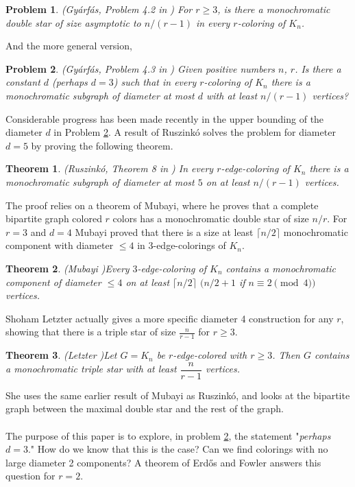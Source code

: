 \documentclass{article}
\newtheorem{theorem}{Theorem}
\newtheorem{problem}{Problem}
\begin{document}
	\begin{problem}\label{P1}(Gy\'arf\'as, Problem 4.2 in \cite{Gy2})
		For $r\ge 3$, is there a
		monochromatic double star of size asymptotic to $n/(r-1)$ in every $r$-coloring of $K_n$.
	\end{problem}
	And the more general version,
	\begin{problem}\label{P2}(Gy\'arf\'as, Problem 4.3 in \cite{Gy2})
		Given positive numbers $n$, $r$.
		Is there a constant $d$ (perhaps $d=3$)
		such that in every $r$-coloring of $K_n$ there is a monochromatic subgraph of diameter at
		most $d$ with at least $n/(r-1)$ vertices?
	\end{problem}
	Considerable progress has been made recently in the upper bounding of the diameter $ d $ in Problem \ref{P2}.
	A result of Ruszink\'{o} solves the problem for diameter $ d=5 $ by proving the following theorem.
	\begin{theorem}\label{fo1}(Ruszink\'{o}, Theorem 8 in \cite{rusz})
		In every $r$-edge-coloring of $K_n$ there is a monochromatic subgraph of diameter at
		most $5$ on at least $n/(r-1)$ vertices.
	\end{theorem}
	The proof relies on a theorem of Mubayi, where he proves that a complete bipartite graph colored $ r $ colors has a monochromatic double star of size $ n/r $. For $ r=3 $ and $ d=4 $ Mubayi proved that there is a size at least $\lceil n/2\rceil$ monochromatic component with diameter $ \leq 4 $ in 3-edge-colorings of $ K_n $.
	\begin{theorem} (Mubayi \cite{M})\label{M3} Every $3$-edge-coloring of $K_n$ contains a
		monochromatic component of diameter $\le 4$ on at least $\lceil n/2\rceil$
		$($$n/2+1$ if $n\equiv 2\pmod{4}$$)$ vertices.
	\end{theorem}
	Shoham Letzter actually gives a more specific diameter 4 construction for any $ r $, showing that there is a triple star of size $ \frac{n}{r-1} $ for $ r\geq 3 $.
	\begin{theorem} (Letzter \cite{SL})\label{SL} 
		Let $ G = K_n $ be $ r $-edge-colored with $ r \ge 3 $. Then $ G $ contains a monochromatic triple star
		with at least $ \dfrac{n}{r-1} $ vertices.
	\end{theorem}
	She uses the same earlier result of Mubayi as Ruszink\'{o}, and looks at the bipartite graph between the maximal double star and the rest of the graph.\\\\
	The purpose of this paper is to explore, in problem \ref{P2}, the statement "\textit{perhaps $ d=3 $}." How do we know that this is the case? Can we find colorings with no large diameter 2 components? A theorem of Erd\H{o}s and Fowler answers this question for $ r=2 $.
\end{document}
